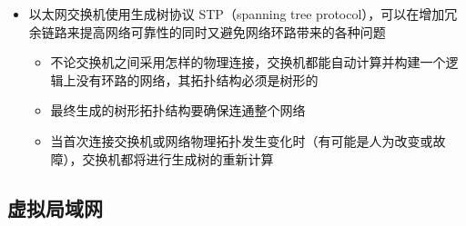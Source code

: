 \documentclass[cs4size,a4paper,10pt]{ctexart}
\begin{document}
	\begin{itemize}
		\item 以太网交换机使用生成树协议 STP（spanning tree protocol），可以在增加冗余链路来提高网络可靠性的同时又避免网络环路带来的各种问题
		\begin{itemize}
			\item 不论交换机之间采用怎样的物理连接，交换机都能自动计算并构建一个逻辑上没有环路的网络，其拓扑结构必须是树形的
			\item 最终生成的树形拓扑结构要确保连通整个网络
			\item 当首次连接交换机或网络物理拓扑发生变化时（有可能是人为改变或故障），交换机都将进行生成树的重新计算
		\end{itemize}
	\end{itemize}

	\subsection{虚拟局域网}
	
\end{document}
